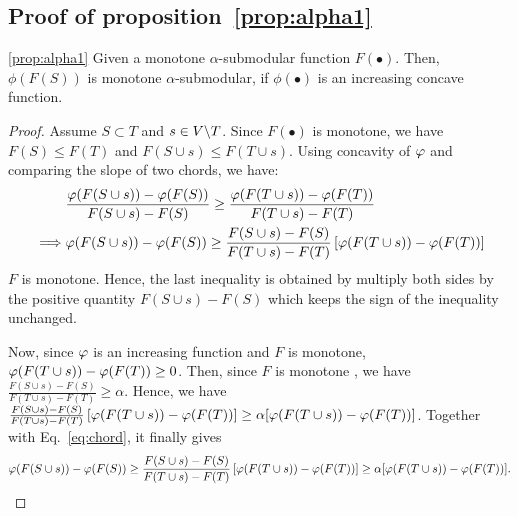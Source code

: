 \documentclass{article}
\begin{document}
\subsection{Proof of proposition~\ref{prop:alpha1}}

\begin{numproposition}{\ref{prop:alpha1}}
Given a monotone $\alpha$-submodular function $F(\bullet)$. Then, $\phi(F(S))$ is monotone $\alpha$-submodular, if $\phi(\bullet)$  is an increasing concave function.
\end{numproposition}

\begin{proof}  
Assume $S\subset T$ and $s\in V\backslash T$. Since $F(\bullet)$ is monotone, we have $F(S)\le F(T)$ and $F(S\cup s)\le F(T\cup s)$. Using concavity of $\varphi$ and comparing the slope of two chords, we have:
 \begin{align}
&  \frac{\varphi(F(S\cup s))-\varphi(F(S))}{F(S\cup s)-F(S)}  \ge   \frac{\varphi(F(T\cup s))-\varphi(F(T))}{F(T\cup s)-F(T)} \nonumber\\
\implies &\varphi(F(S\cup s))-\varphi(F(S)) \ge  \frac{F(S\cup s)-F(S)}{F(T\cup s)-F(T)} \left[\varphi(F(T\cup s))-\varphi(F(T))\right] \label{eq:chord}
 \end{align}
$F$ is monotone. Hence, the last inequality is obtained by multiply both sides by the positive quantity ${F(S\cup s)-F(S)}$ which keeps the sign of the inequality unchanged.
 

Now, since $\varphi$ is an increasing function and $F$ is monotone, $\varphi(F(T\cup s))-\varphi(F(T)) \ge 0$. Then, since $F$ is monotone \asb, we have $ \frac{F(S\cup s)-F(S)}{F(T\cup s)-F(T)} \ge {\alpha}$. Hence, we have $\frac{F(S\cup s)-F(S)}{F(T\cup s)-F(T)} \left[\varphi(F(T\cup s))-\varphi(F(T)) \right]\ge  {\alpha}[\varphi(F(T\cup s))-\varphi(F(T))]$. Together with Eq.~\eqref{eq:chord}, it finally gives
$$ \varphi(F(S\cup s))-\varphi(F(S))  \ge \frac{F(S\cup s)-F(S)}{F(T\cup s)-F(T)} \left[\varphi(F(T\cup s))-\varphi(F(T)) \right]\ge {\alpha}[  \varphi(F(T\cup s))-\varphi(F(T))].$$
\end{proof}
 
\end{document}
